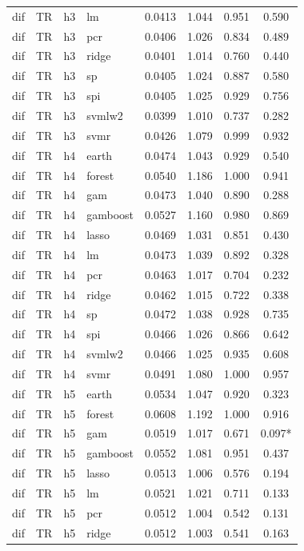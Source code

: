 \begin{ThreePartTable}
\begin{longtable}[t]{llclcccc}
dif & TR & h3 & lm & 0.0413 & 1.044 & 0.951 & 0.590\\
dif & TR & h3 & pcr & 0.0406 & 1.026 & 0.834 & 0.489\\
dif & TR & h3 & ridge & 0.0401 & 1.014 & 0.760 & 0.440\\
dif & TR & h3 & sp & 0.0405 & 1.024 & 0.887 & 0.580\\
dif & TR & h3 & spi & 0.0405 & 1.025 & 0.929 & 0.756\\
dif & TR & h3 & svmlw2 & 0.0399 & 1.010 & 0.737 & 0.282\\
dif & TR & h3 & svmr & 0.0426 & 1.079 & 0.999 & 0.932\\
\addlinespace
dif & TR & h4 & earth & 0.0474 & 1.043 & 0.929 & 0.540\\
dif & TR & h4 & forest & 0.0540 & 1.186 & 1.000 & 0.941\\
dif & TR & h4 & gam & 0.0473 & 1.040 & 0.890 & 0.288\\
dif & TR & h4 & gamboost & 0.0527 & 1.160 & 0.980 & 0.869\\
dif & TR & h4 & lasso & 0.0469 & 1.031 & 0.851 & 0.430\\
dif & TR & h4 & lm & 0.0473 & 1.039 & 0.892 & 0.328\\
dif & TR & h4 & pcr & 0.0463 & 1.017 & 0.704 & 0.232\\
dif & TR & h4 & ridge & 0.0462 & 1.015 & 0.722 & 0.338\\
dif & TR & h4 & sp & 0.0472 & 1.038 & 0.928 & 0.735\\
dif & TR & h4 & spi & 0.0466 & 1.026 & 0.866 & 0.642\\
dif & TR & h4 & svmlw2 & 0.0466 & 1.025 & 0.935 & 0.608\\
dif & TR & h4 & svmr & 0.0491 & 1.080 & 1.000 & 0.957\\
\addlinespace
dif & TR & h5 & earth & 0.0534 & 1.047 & 0.920 & 0.323\\
dif & TR & h5 & forest & 0.0608 & 1.192 & 1.000 & 0.916\\
dif & TR & h5 & gam & 0.0519 & 1.017 & 0.671 & 0.097*\\
dif & TR & h5 & gamboost & 0.0552 & 1.081 & 0.951 & 0.437\\
dif & TR & h5 & lasso & 0.0513 & 1.006 & 0.576 & 0.194\\
dif & TR & h5 & lm & 0.0521 & 1.021 & 0.711 & 0.133\\
dif & TR & h5 & pcr & 0.0512 & 1.004 & 0.542 & 0.131\\
dif & TR & h5 & ridge & 0.0512 & 1.003 & 0.541 & 0.163\\

\end{longtable}
\end{ThreePartTable}
